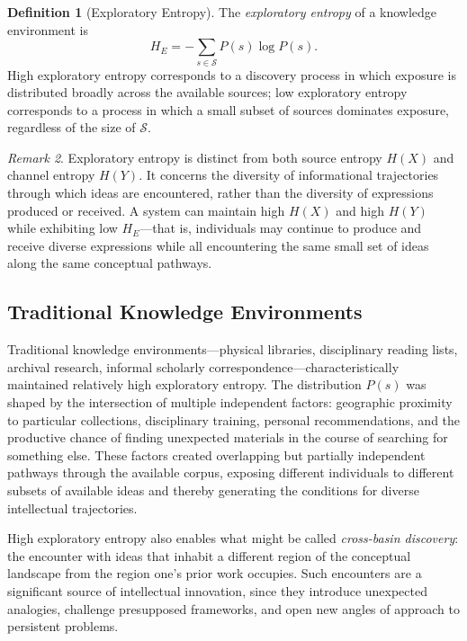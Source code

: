 \documentclass[12pt,a4paper]{article}
\theoremstyle{definition}
\newtheorem{definition}{Definition}[section]
\theoremstyle{plain}
\theoremstyle{remark}
\newtheorem{remark}[definition]{Remark}
\newcommand{\HE}{H_{E}}
\newcommand{\calS}{\mathcal{S}}
\begin{document}
\begin{definition}[Exploratory Entropy]
The \emph{exploratory entropy} of a knowledge environment is
\[
\HE = -\sum_{s \in \calS} P(s)\log P(s).
\]
High exploratory entropy corresponds to a discovery process in which exposure is distributed
broadly across the available sources; low exploratory entropy corresponds to a process in
which a small subset of sources dominates exposure, regardless of the size of $\calS$.
\end{definition}

\begin{remark}
Exploratory entropy is distinct from both source entropy $H(X)$ and channel entropy $H(Y)$.
It concerns the diversity of informational trajectories through which ideas are encountered,
rather than the diversity of expressions produced or received. A system can maintain high
$H(X)$ and high $H(Y)$ while exhibiting low $\HE$---that is, individuals may continue to
produce and receive diverse expressions while all encountering the same small set of ideas
along the same conceptual pathways.
\end{remark}

\subsection{Traditional Knowledge Environments}

Traditional knowledge environments---physical libraries, disciplinary reading lists, archival
research, informal scholarly correspondence---characteristically maintained relatively high
exploratory entropy. The distribution $P(s)$ was shaped by the intersection of multiple
independent factors: geographic proximity to particular collections, disciplinary training,
personal recommendations, and the productive chance of finding unexpected materials in the
course of searching for something else. These factors created overlapping but partially
independent pathways through the available corpus, exposing different individuals to different
subsets of available ideas and thereby generating the conditions for diverse intellectual
trajectories.

High exploratory entropy also enables what might be called \emph{cross-basin discovery}: the
encounter with ideas that inhabit a different region of the conceptual landscape from the
region one's prior work occupies. Such encounters are a significant source of intellectual
innovation, since they introduce unexpected analogies, challenge presupposed frameworks, and
open new angles of approach to persistent problems.
\end{document}
